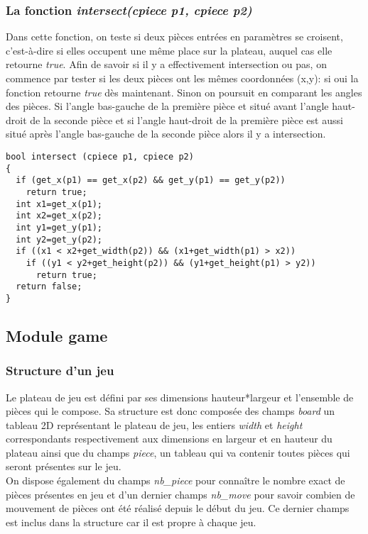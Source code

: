 \documentclass{report}
\begin{document}
\subsubsection*{La fonction \textit{intersect(cpiece p1, cpiece p2)}}
Dans cette fonction, on teste si deux pièces entrées en paramètres se croisent, c'est-à-dire si elles occupent une même place sur la plateau, auquel cas elle retourne \textit{true}. Afin de savoir si il y a effectivement intersection ou pas, on commence par tester si les deux pièces ont les mêmes coordonnées (x,y): si oui la fonction retourne \textit{true} dès maintenant. Sinon on poursuit en comparant les angles des pièces. Si l'angle bas-gauche de la première pièce et situé avant l'angle haut-droit de la seconde pièce et si l'angle haut-droit de la première pièce est aussi situé après l'angle bas-gauche de la seconde pièce alors il y a intersection.
\begin{lstlisting}
bool intersect (cpiece p1, cpiece p2)
{
  if (get_x(p1) == get_x(p2) && get_y(p1) == get_y(p2)) 
    return true;
  int x1=get_x(p1);
  int x2=get_x(p2);
  int y1=get_y(p1);
  int y2=get_y(p2);
  if ((x1 < x2+get_width(p2)) && (x1+get_width(p1) > x2))
    if ((y1 < y2+get_height(p2)) && (y1+get_height(p1) > y2))
      return true;
  return false;
}
\end{lstlisting}

\subsection{Module game}
\subsubsection{Structure d'un jeu}
Le plateau de jeu est défini par ses dimensions hauteur*largeur et l'ensemble de pièces qui le compose. Sa structure est donc composée des champs \textit{board} un tableau 2D représentant le plateau de jeu, les entiers \textit{width} et \textit{height} correspondants respectivement aux dimensions en largeur et en hauteur du plateau ainsi que du champs \textit{piece}, un tableau qui va contenir toutes pièces qui seront présentes sur le jeu. \\
On dispose également du champs \textit{nb\_piece} pour connaître le nombre exact de pièces présentes en jeu et d'un dernier champs \textit{nb\_move} pour savoir combien de mouvement de pièces ont été réalisé depuis le début du jeu. Ce dernier champs est inclus dans la structure car il est propre à chaque jeu.\\
\end{document}
